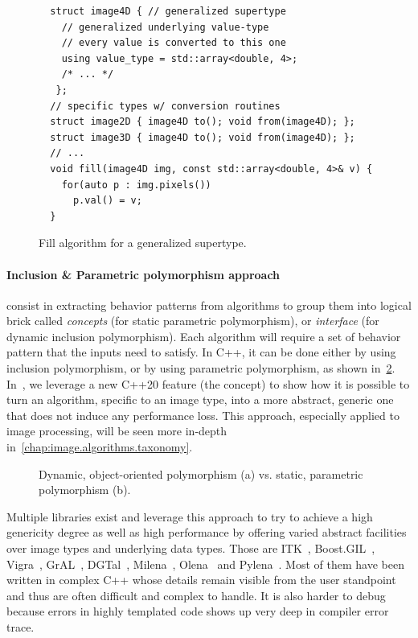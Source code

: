 \begin{figure}[htbp]
  \centering
  \begin{verbatim}
  struct image4D { // generalized supertype
    // generalized underlying value-type
    // every value is converted to this one
    using value_type = std::array<double, 4>;
    /* ... */
   };
  // specific types w/ conversion routines
  struct image2D { image4D to(); void from(image4D); };
  struct image3D { image4D to(); void from(image4D); };
  // ...
  void fill(image4D img, const std::array<double, 4>& v) {
    for(auto p : img.pixels())
      p.val() = v;
  }
  \end{verbatim}
  \caption{Fill algorithm for a generalized supertype.}
  \label{code:gen.generalized}
\end{figure}

\paragraph{Inclusion \& Parametric polymorphism approach} consist in extracting behavior patterns from algorithms to
group them into logical brick called \emph{concepts} (for static parametric polymorphism), or \emph{interface} (for
dynamic inclusion polymorphism). Each algorithm will require a set of behavior pattern that the inputs need to satisfy.
In C++, it can be done either by using inclusion polymorphism, or by using parametric polymorphism, as shown
in~\ref{code:gen.inclupoly}. In~\cite{roynard.2019.rrpr}, we leverage a new C++20 feature (the concept) to show how it
is possible to turn an algorithm, specific to an image type, into a more abstract, generic one that does not induce any
performance loss. This approach, especially applied to image processing, will be seen more in-depth
in~\cref{chap:image.algorithms.taxonomy}.

\begin{figure}[htb]
  \centering
  \hfil
  \vfil
  \hfil
  \caption{Dynamic, object-oriented polymorphism (a) vs. static, parametric polymorphism (b).}
  \label{code:gen.inclupoly}
\end{figure}

Multiple libraries exist and leverage this approach to try to achieve a high genericity degree as well as high
performance by offering varied abstract facilities over image types and underlying data types. Those are
ITK~\cite{johnson.2013.ITKSoftwareGuideThirdEdition}, Boost.GIL~\cite{bourdev.2006.bgil},
Vigra~\cite{kothe.2011.generic}, GrAL~\cite{berti.2006.gral}, DGTal~\cite{coeurjolly.2016.dgtal},
Milena~\cite{levillain.2009.ismm,levillain.2010.icip},
Olena~\cite{olena.2000.www,levillain.2011.phd,geraud.2012.hdr,levillain.2014.ciarp} and
Pylena~\cite{carlinet.2018.pylena}. Most of them have been written in complex C++ whose details remain visible from the
user standpoint and thus are often difficult and complex to handle. It is also harder to debug because errors in highly
templated code shows up very deep in compiler error trace.

